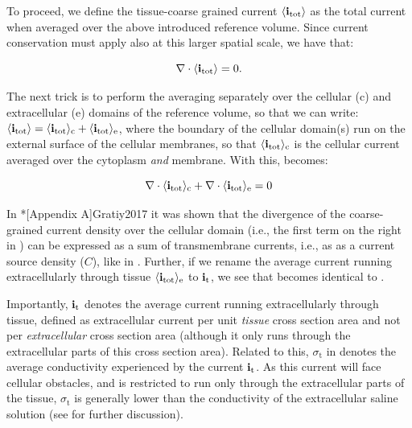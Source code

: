 To proceed, we define the tissue-coarse grained current $\left<{\bf i}_\text{tot}\right>$ 
as the total current when averaged over the above introduced reference volume. 
Since current conservation must apply also at this larger spatial scale, we have that:

\begin{equation}
{\bf \nabla} \cdot \langle{\bf i}_\text{tot}\rangle = 0.
\label{eq:Basics:Sergey2}
\end{equation}

The next trick is to perform the averaging separately over 
the cellular (c) and extracellular (e) domains of the reference volume, so that we can write: 
$\langle{\bf i}_\text{tot}\rangle = \langle{\bf i}_\text{tot}\rangle_\text{c} + \langle{\bf i}_\text{tot}\rangle_\text{e}$, 
where the boundary of the cellular domain(s) run on the external surface of the cellular membranes,
so that $\langle{\bf i}_\text{tot}\rangle_\text{c}$ is the cellular current averaged over the cytoplasm \emph{and} membrane.
With this,  becomes: 

\begin{equation}
{\bf \nabla} \cdot \langle{\bf i}_\text{tot}\rangle_\text{c}  + {\bf \nabla}\cdot \langle{\bf i}_\text{tot}\rangle_\text{e} = 0
\label{eq:Basics:Sergey3}
\end{equation}

In \citeasnoun**[Appendix A]{Gratiy2017} it was shown that the divergence of the coarse-grained current density 
over the cellular domain (i.e., the first term on the right in ) 
can be expressed as a sum of transmembrane currents, 
i.e., as as a current source density ($C$), like in . 
Further, if we rename the average current running extracellularly through tissue 
$\langle{\bf i}_\text{tot}\rangle_\text{e}$ to ${\bf i}_\text{t}$, 
we see that  becomes identical to  . 

Importantly, ${\bf i}_\text{t}$ denotes the average current running extracellularly through tissue, 
defined as extracellular current per unit \textit{tissue} cross section area 
and not per \textit{extracellular} cross section area 
(although it only runs through the extracellular parts of this cross section area). 
Related to this, $\sigma_\text{t}$ in  denotes the average conductivity 
experienced by the current ${\bf i}_\text{t}$. 
As this current will face cellular obstacles, 
and is restricted to run only through the extracellular parts of the tissue, 
$\sigma_\text{t}$ is generally lower than the conductivity of the extracellular saline solution 
(see  for further discussion). 


